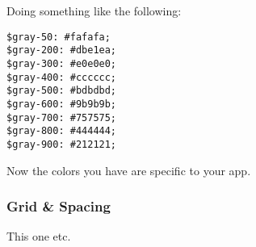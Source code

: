 Doing something like the following:
\begin{lstlisting}
$gray-50: #fafafa;
$gray-200: #dbe1ea;
$gray-300: #e0e0e0;
$gray-400: #cccccc;
$gray-500: #bdbdbd;
$gray-600: #9b9b9b;
$gray-700: #757575;
$gray-800: #444444;
$gray-900: #212121;
\end{lstlisting}

Now the colors you have are specific to your app.

\subsubsection{ Grid & Spacing }
This one etc.
